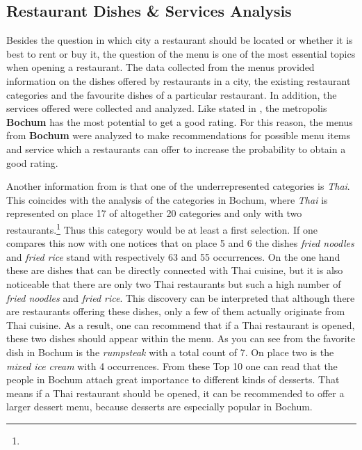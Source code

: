 \subsection{Restaurant Dishes \& Services Analysis}
\label{subsec:menu}
Besides the question in which city a restaurant should be located or whether it is best to rent or buy it,
the question of the menu is one of the most essential topics when opening a restaurant.
\newline
The data collected from the menus provided information on the dishes offered by restaurants in a city,
the existing restaurant categories and the favourite dishes of a particular restaurant.
In addition, the services offered were collected and analyzed.
\newline
Like stated in , the metropolis \textbf{Bochum} has the most potential to get a good rating.
For this reason, the menus from \textbf{Bochum} were analyzed to make recommendations for possible menu items and service which a restaurants can offer
to increase the probability to obtain a good rating.
\newline


Another information from  is that one of the underrepresented categories is \textit{Thai}.
This coincides with the analysis of the categories in Bochum, where \textit{Thai} is represented on place 17 of altogether 20 categories and only with two restaurants.\footnote{}
Thus this category would be at least a first selection.
If one compares this now with  one notices that on place 5 and 6 the dishes \textit{fried noodles} and \textit{fried rice} stand with respectively 63 and 55 occurrences.
On the one hand these are dishes that can be directly connected with Thai cuisine,
but it is also noticeable that there are only two Thai restaurants but such a high number of \textit{fried noodles} and \textit{fried rice}.
This discovery can be interpreted that although there are restaurants offering these dishes, only a few of them actually originate from Thai cuisine.
As a result, one can recommend that if a Thai restaurant is opened, these two dishes should appear within the menu.
As you can see from  the favorite dish in Bochum is the \textit{rumpsteak} with a total count of 7.
On place two is the \textit{mixed ice cream} with 4 occurrences.
From these Top 10 one can read that the people in Bochum attach great importance to different kinds of desserts.
That means if a Thai restaurant should be opened, it can be recommended to offer a larger dessert menu, because desserts are especially popular in Bochum.
\newline
